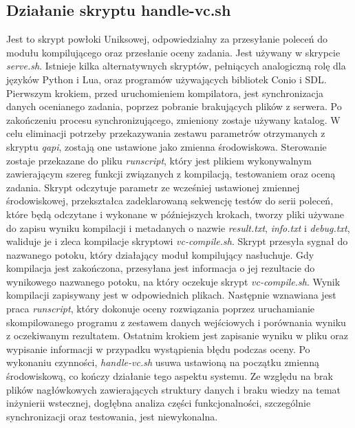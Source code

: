 \subsection{Działanie skryptu handle-vc.sh}
Jest to skrypt powłoki Uniksowej, odpowiedzialny za przesyłanie poleceń do modułu kompilującego oraz przesłanie oceny zadania. Jest używany w skrypcie \textit{serve.sh}. Istnieje kilka alternatywnych skryptów, pełniących analogiczną rolę dla języków Python i Lua, oraz programów używających bibliotek Conio i SDL. Pierwszym krokiem, przed uruchomieniem kompilatora, jest synchronizacja danych ocenianego zadania, poprzez pobranie brakujących plików z serwera. Po zakończeniu procesu synchronizującego, zmieniony zostaje używany katalog. W celu eliminacji potrzeby przekazywania zestawu parametrów otrzymanych z skryptu \textit{qapi}, zostają one ustawione jako zmienna środowiskowa. Sterowanie zostaje przekazane do pliku \textit{runscript}, który jest plikiem wykonywalnym zawierającym szereg funkcji związanych z kompilacją, testowaniem oraz oceną zadania. Skrypt odczytuje parametr ze wcześniej ustawionej zmiennej środowiskowej, przekształca zadeklarowaną sekwencję testów do serii poleceń, które będą odczytane i wykonane w późniejszych krokach, tworzy pliki używane do zapisu wyniku kompilacji i metadanych o nazwie \textit{result.txt}, \textit{info.txt} i \textit{debug.txt}, waliduje je i zleca kompilacje skryptowi \textit{vc-compile.sh}. Skrypt przesyła sygnał do nazwanego potoku, który działający moduł kompilujący nasłuchuje. Gdy kompilacja jest zakończona, przesyłana jest informacja o jej rezultacie do wynikowego nazwanego potoku, na który oczekuje skrypt \textit{vc-compile.sh}. Wynik kompilacji zapisywany jest w odpowiednich plikach. Następnie wznawiana jest praca \textit{runscript}, który dokonuje oceny rozwiązania poprzez uruchamianie skompilowanego programu z zestawem danych wejściowych i porównania wyniku z oczekiwanym rezultatem. Ostatnim krokiem jest zapisanie wyniku w pliku oraz wypisanie informacji w przypadku wystąpienia błędu podczas oceny. Po wykonaniu czynności, \textit{handle-vc.sh} usuwa ustawioną na początku zmienną środowiskową, co kończy działanie tego aspektu systemu. Ze względu na brak plików nagłówkowych zawierających struktury danych i braku wiedzy na temat inżynierii wstecznej, dogłębna analiza części funkcjonalności, szczególnie synchronizacji oraz testowania, jest niewykonalna.
